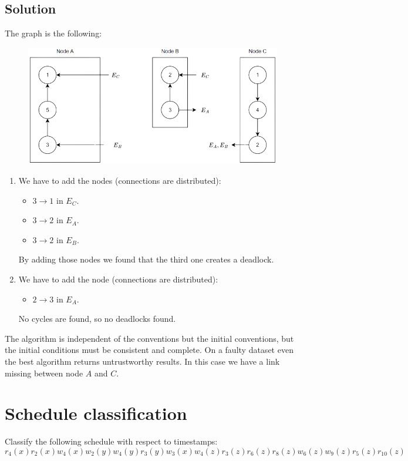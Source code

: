 \documentclass[12pt, a4paper]{report}
\begin{document}
    \subsection*{Solution}
        The graph is the following: 
        \begin{figure}[H]
            \centering
            \includegraphics[width=0.75\linewidth]{images/Ob4.png}
        \end{figure}
        \begin{enumerate}
            \item We have to add the nodes (connections are distributed): 
                \begin{itemize}
                    \item $3 \rightarrow 1$ in $E_C$. 
                    \item $3 \rightarrow 2$ in $E_A$. 
                    \item $3 \rightarrow 2$ in $E_B$. 
                \end{itemize}
                By adding those nodes we found that the third one creates a deadlock. 
            \item We have to add the node (connections are distributed): 
                \begin{itemize}
                    \item $2 \rightarrow 3$ in $E_A$. 
                \end{itemize}
                No cycles are found, so no deadlocks found. 
        \end{enumerate}
        The algorithm is independent of the conventions but the initial conventions, but the initial conditions must be consistent and complete. 
        On a faulty dataset even the best algorithm returns untrustworthy results. In this case we have a link missing between node $A$ and $C$.

    \newpage

    \section{Schedule classification}
        Classify the following schedule with respect to timestamps: 
        \[r_4(x) r_2(x) w_4(x) w_2(y) w_4(y) r_3(y) w_3(x) w_4(z) r_3(z) r_6(z) r_8(z) w_6(z) w_9(z) r_5(z) r_{10}(z)\]
\end{document}
